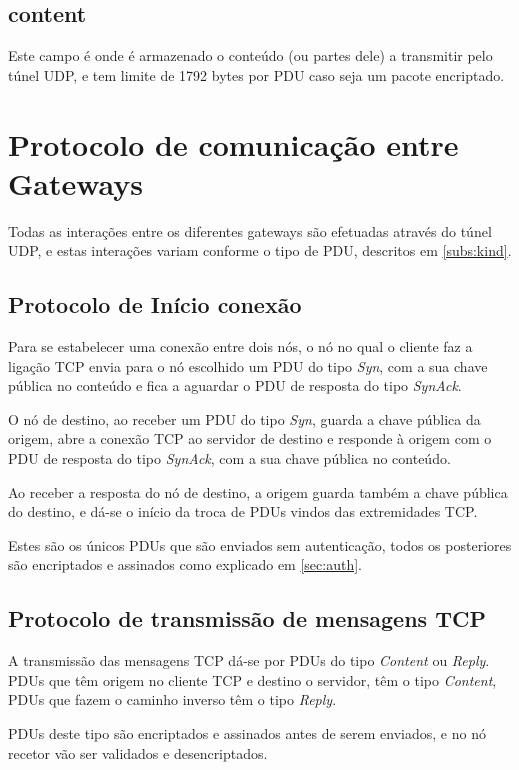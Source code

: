 \documentclass[a4paper]{report}
\begin{document}
\subsection{content}

Este campo é onde é armazenado o conteúdo (ou partes dele) a transmitir pelo
túnel UDP, e tem limite de 1792 bytes por PDU caso seja um pacote encriptado.

\section{Protocolo de comunicação entre Gateways}

Todas as interações entre os diferentes gateways são efetuadas através do túnel
UDP, e estas interações variam conforme o tipo de PDU, descritos em 
\ref{subs:kind}.

\subsection{Protocolo de Início conexão}

Para se estabelecer uma conexão entre dois nós, o nó no qual o cliente
faz a ligação TCP envia para o nó escolhido um PDU do tipo \textit{Syn},
com a sua chave pública no conteúdo e fica a aguardar o PDU de resposta 
do tipo \textit{SynAck}.

O nó de destino, ao receber um PDU do tipo \textit{Syn}, guarda
a chave pública da origem, abre a conexão TCP ao servidor de destino e
responde à origem com o PDU de resposta do tipo \textit{SynAck}, com a sua
chave pública no conteúdo.

Ao receber a resposta do nó de destino, a origem guarda também a chave
pública do destino, e dá-se o início da troca de PDUs vindos das 
extremidades TCP.

Estes são os únicos PDUs que são enviados sem autenticação, todos os
posteriores são encriptados e assinados como explicado em \ref{sec:auth}.

\subsection{Protocolo de transmissão de mensagens TCP}

A transmissão das mensagens TCP dá-se por PDUs do tipo \textit{Content} ou
\textit{Reply}. PDUs que têm origem no cliente TCP e destino o servidor,
têm o tipo \textit{Content}, PDUs que fazem o caminho inverso têm o tipo
\textit{Reply}.

PDUs deste tipo são encriptados e assinados antes de serem enviados, e no
nó recetor vão ser validados e desencriptados.
\end{document}
